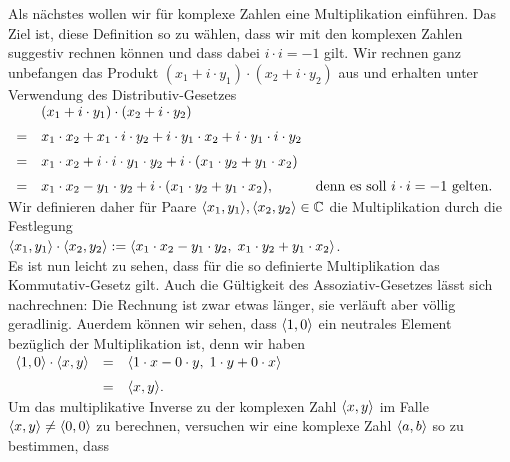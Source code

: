 Als n\"{a}chstes wollen wir f\"{u}r 
komplexe Zahlen eine Multiplikation einf\"{u}hren.   Das Ziel ist,
diese Definition so zu w\"{a}hlen, dass wir mit den komplexen Zahlen suggestiv rechnen k\"{o}nnen
und dass dabei $i \cdot i = -1$ gilt.  Wir rechnen ganz unbefangen das Produkt 
$(x_1 + i \cdot y_1) \cdot (x_2 + i \cdot y_2)$ aus und erhalten unter Verwendung des
Distributiv-Gesetzes 
\\[0.2cm]
\hspace*{1.3cm}
$
\begin{array}[t]{cll}
  & (x_1 + i \cdot y_1) \cdot (x_2 + i \cdot y_2) \\[0.2cm]
= & x_1 \cdot x_2 + x_1 \cdot i \cdot y_2 + i \cdot y_1 \cdot x_2 + i \cdot y_1 \cdot i \cdot y_2
    \\[0.2cm]
= & x_1 \cdot x_2 + i \cdot i \cdot y_1 \cdot y_2 + i \cdot (x_1 \cdot y_2 + y_1 \cdot x_2) \\[0.2cm]
= & x_1 \cdot x_2 - y_1 \cdot y_2 + i \cdot (x_1 \cdot y_2 + y_1 \cdot x_2),
  & \mbox{denn es soll $i \cdot i = -1$ gelten.} 
\end{array}
$
\\[0.2cm]
Wir definieren daher f\"{u}r Paare $\pair(x_1,y_1), \pair(x_2,y_2) \in \mathbb{C}$ die Multiplikation durch
die Festlegung
\\[0.2cm]
\hspace*{1.3cm}
$\pair(x_1,y_1) \cdot \pair(x_2,y_2) := 
 \pair(x_1 \cdot x_2 - y_1 \cdot y_2,\; x_1 \cdot y_2 + y_1 \cdot x_2)
$.
\\[0.2cm]
Es ist nun leicht zu sehen, dass f\"{u}r die so definierte Multiplikation das Kommutativ-Gesetz gilt.
Auch die G\"{u}ltigkeit des Assoziativ-Gesetzes l\"{a}sst sich nachrechnen: Die Rechnung ist zwar etwas l\"{a}nger,
sie verl\"{a}uft aber v\"{o}llig geradlinig.  Au\3erdem k\"{o}nnen wir sehen, dass $\pair(1,0)$ ein neutrales Element
bez\"{u}glich der Multiplikation ist, denn wir haben
\\[0.2cm]
\hspace*{1.3cm}
$
\begin{array}[t]{lcll}
  \pair(1,0) \cdot \pair(x,y) & = & \pair(1 \cdot x - 0 \cdot y,\; 1 \cdot y + 0 \cdot x) \\[0.2cm]
                              & = & \pair(x, y). 
\end{array}
$
\\[0.2cm]
Um das multiplikative Inverse zu der komplexen Zahl $\pair(x,y)$ im Falle $\pair(x,y) \not= \pair(0,0)$
zu berechnen, versuchen wir eine komplexe Zahl $\pair(a,b)$ so zu bestimmen, dass
